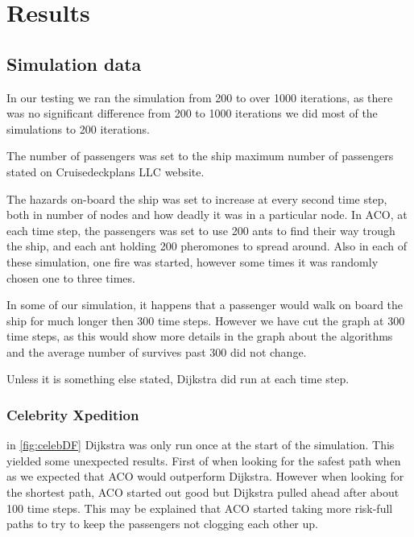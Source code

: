 \chapter{Results}
\label{ch:testing}

\section{Simulation data}
In our testing we ran the simulation from 200 to over 1000 iterations, as there was no significant difference from 200 to 1000 iterations we did most of the simulations to 200 iterations.

The number of passengers was set to the ship maximum number of passengers stated on Cruisedeckplans LLC\cite{cruseships} website.

The hazards on-board the ship was set to increase at every second time step, both in number of nodes and how deadly it was in a particular node. In ACO, at each time step, the passengers was set to use 200 ants to find their way trough the ship, and each ant holding 200 pheromones to spread around. Also in each of these simulation, one fire was started, however some times it was randomly chosen one to three times.

In some of our simulation, it happens that a passenger would walk on board the ship for much longer then 300 time steps. However we have cut the graph at 300 time steps, as this would show more details in the graph about the algorithms and the average number of survives past 300 did not change. 

Unless it is something else stated, Dijkstra did run at each time step.



\subsection{Celebrity Xpedition}


in \ref{fig:celebDF} Dijkstra was only run once at the start of the simulation. This yielded some unexpected results. First of when looking for the safest path when as we expected that ACO would outperform Dijkstra. However when looking for the shortest path, ACO started out good but Dijkstra pulled ahead after about 100 time steps. This may be explained that ACO started taking more risk-full paths to try to keep the passengers not clogging each other up. 

